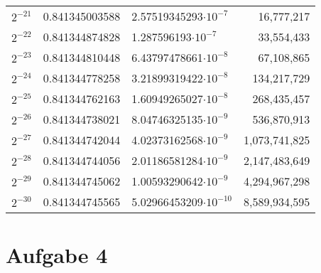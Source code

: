 \documentclass{article}
\begin{document}
\begin{table}[h]
\begin{tabular}{lllr}
					$2^{-21}$            & 0.841345003588                & 2.57519345293$\cdot 10^{-7}$ & 16,777,217                                            \\
					$2^{-22}$            & 0.841344874828                & 1.287596193$\cdot 10^{-7}$  & 33,554,433                                            \\
					$2^{-23}$            & 0.841344810448                & 6.43797478661$\cdot 10^{-8}$ & 67,108,865                                            \\
					$2^{-24}$            & 0.841344778258                & 3.21899319422$\cdot 10^{-8}$ & 134,217,729                                           \\
					$2^{-25}$            & 0.841344762163                & 1.60949265027$\cdot 10^{-8}$ & 268,435,457                                           \\
					$2^{-26}$            & 0.841344738021                & 8.04746325135$\cdot 10^{-9}$  & 536,870,913                                           \\
					$2^{-27}$            & 0.841344742044                & 4.02373162568$\cdot 10^{-9}$  & 1,073,741,825                                         \\
					$2^{-28}$            & 0.841344744056                & 2.01186581284$\cdot 10^{-9}$  & 2,147,483,649                                         \\
					$2^{-29}$            & 0.841344745062                & 1.00593290642$\cdot 10^{-9}$  & 4,294,967,298                                         \\
					$2^{-30}$            & 0.841344745565                & 5.02966453209$\cdot 10^{-10}$ & 8,589,934,595                                        
				\end{tabular}
			\end{table}
		
		
		
		\pagebreak
		
		\section*{Aufgabe 4}
\end{document}
